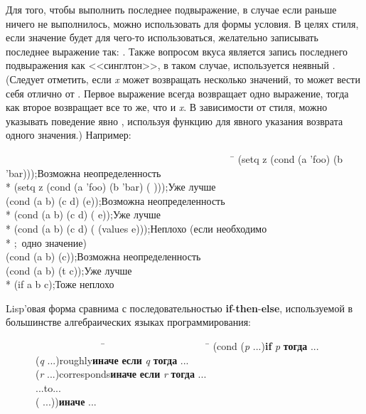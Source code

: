 \begin{defmac}
Для того, чтобы выполнить последнее подвыражение, в случае если раньше ничего не
выполнилось, можно использовать {\true} для формы условия.
В целях стиля, если значение  будет для чего-то использоваться,
желательно записывать последнее выражение так: \cd{({\true} {\false})}.
Также вопросом вкуса является запись последнего подвыражения  как
<<синглтон>>, в таком случае, используется неявный {\true}.
(Следует отметить, если \emph{x} может возвращать несколько значений, то
 может вести себя отлично от 
. Первое выражение всегда возвращает одно
выражение, тогда как второе возвращает все то же, что и \emph{x}. В зависимости
от стиля, можно указывать поведение явно ,
используя функцию  для явного указания возврата одного значения.)
Например:
\begin{lisp}
~~~~~~~~~~~~~~~~~~~~~~~~~~~~~~~~~~~~~~~~~~~~~~\=\kill
(setq z (cond (a 'foo) (b 'bar)))\>;\textrm{Возможна неопределенность} \\*
(setq z (cond (a 'foo) (b 'bar) ({\true} {\false})))\>;\textrm{Уже лучше} \\
(cond (a b) (c d) (e))\>;\textrm{Возможна неопределенность} \\*
(cond (a b) (c d) ({\true} e))\>;\textrm{Уже лучше} \\*
(cond (a b) (c d) ({\true} (values e)))\>;\textrm{Неплохо (если необходимо} \\*
                                       \>;~\textrm{одно значение)} \\
(cond (a b) (c))\>;\textrm{Возможна неопределенность} \\
(cond (a b) (t c))\>;\textrm{Уже лучше} \\*
(if a b c)\>;\textrm{Тоже неплохо}
\end{lisp}
Lisp'овая форма  сравнима с последовательностью
\textbf{if}-\textbf{then}-\textbf{else}, используемой в большинстве
алгебраических языках программирования:
\begin{lisp}
~~~~~~~~~~~~~~~~~~~~\=~~~~~~~~~~~~~~~~~~~~~\=\kill
(cond (\emph{p} ...)\>\>\textbf{if} \emph{p} \textbf{тогда} ... \\
~~~~~~(\emph{q} ...)\>\textrm{roughly}\>\textbf{иначе} \textbf{если} \emph{q} \textbf{тогда} ... \\
~~~~~~(\emph{r} ...)\>\textrm{corresponds}\>\textbf{иначе} \textbf{если} \emph{r} \textbf{тогда} ... \\
~~~~~~...\>\textrm{to}\>... \\
~~~~~~({\true} ...))\>\>\textbf{иначе} ...
\end{lisp}
\end{defmac}

